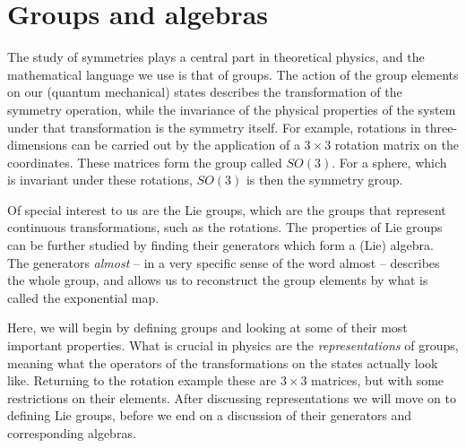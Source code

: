 \documentclass[notes.tex]{subfiles}
\begin{document}
\chapter{Groups and algebras}
\label{chap:groups}

The study of symmetries plays a central part in theoretical physics, and the mathematical language we use is that of groups. The action of the group elements on our (quantum mechanical) states describes the transformation of the symmetry operation, while the invariance of the physical properties of the system under that transformation is the symmetry itself. For example, rotations in three-dimensions can be carried out by the application of a $3\times3$ rotation matrix on the coordinates. These matrices form the group called $SO(3)$. For a sphere, which is invariant under these rotations, $SO(3)$ is then the symmetry group.

Of special interest to us are the Lie groups, which are the groups that represent continuous transformations, such as the rotations. The properties of Lie groups can be further studied by finding their generators which form a (Lie) algebra. The generators {\it almost} -- in a very specific sense of the word almost -- describes the whole group, and allows us to reconstruct the group elements by what is called the exponential map.

Here, we will begin by defining groups and looking at some of their most important properties. What is crucial in physics are the {\it representations} of groups, meaning what the operators of the transformations on the states actually look like. Returning to the rotation example these are $3\times3$ matrices, but with some restrictions on their elements. After discussing representations we will move on to defining Lie groups, before we end on a discussion of their generators and corresponding algebras.

\end{document}
